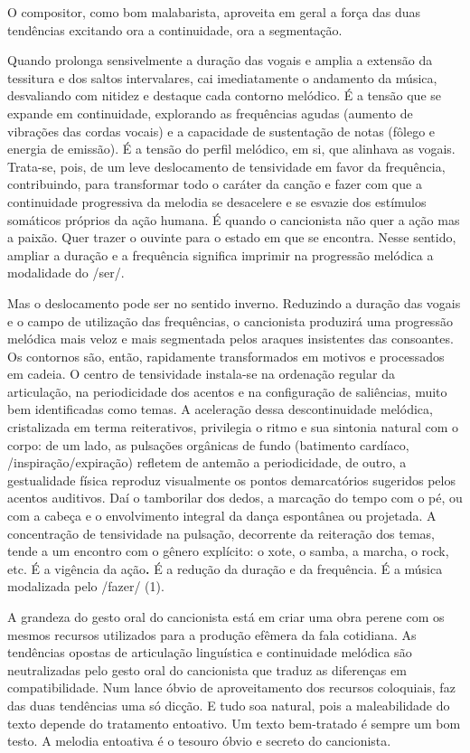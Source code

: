 O compositor, como bom malabarista, aproveita em geral a força das duas
tendências excitando ora a continuidade, ora a segmentação.

Quando prolonga sensivelmente a duração das vogais e amplia a extensão
da tessitura e dos saltos intervalares, cai imediatamente o andamento da
música, desvaliando com nitidez e destaque cada contorno melódico. É a
tensão que se expande em continuidade, explorando as frequências agudas
(aumento de vibrações das cordas vocais) e a capacidade de sustentação
de notas (fôlego e energia de emissão). É a tensão do perfil melódico,
em si, que alinhava as vogais. Trata-se, pois, de um leve deslocamento
de tensividade em favor da frequência, contribuindo, para transformar
todo o caráter da canção e fazer com que a continuidade progressiva da
melodia se desacelere e se esvazie dos estímulos somáticos próprios da
ação humana. É quando o cancionista não quer a ação mas a paixão. Quer
trazer o ouvinte para o estado em que se encontra. Nesse sentido,
ampliar a duração e a frequência significa imprimir na progressão
melódica a modalidade do /ser/.

Mas o deslocamento pode ser no sentido inverno. Reduzindo a duração das
vogais e o campo de utilização das frequências, o cancionista produzirá
uma progressão melódica mais veloz e mais segmentada pelos araques
insistentes das consoantes. Os contornos são, então, rapidamente
transformados em motivos e processados em cadeia. O centro de
tensividade instala-se na ordenação regular da articulação, na
periodicidade dos acentos e na configuração de saliências, muito bem
identificadas como temas. A aceleração dessa descontinuidade melódica,
cristalizada em terma reiterativos, privilegia o ritmo e sua sintonia
natural com o corpo: de um lado, as pulsações orgânicas de fundo
(batimento cardíaco, /inspiração/expiração) refletem de antemão a
periodicidade, de outro, a gestualidade física reproduz visualmente os
pontos demarcatórios sugeridos pelos acentos auditivos. Daí o tamborilar
dos dedos, a marcação do tempo com o pé, ou com a cabeça e o
envolvimento integral da dança espontânea ou projetada. A concentração
de tensividade na pulsação, decorrente da reiteração dos temas, tende a
um encontro com o gênero explícito: o xote, o samba, a marcha, o rock,
etc. É a vigência da ação\textbf{.} É a redução da duração e da
frequência. É a música modalizada pelo /fazer/ (1).

A grandeza do gesto oral do cancionista está em criar uma obra perene
com os mesmos recursos utilizados para a produção efêmera da fala
cotidiana. As tendências opostas de articulação linguística e
continuidade melódica são neutralizadas pelo gesto oral do cancionista
que traduz as diferenças em compatibilidade. Num lance óbvio de
aproveitamento dos recursos coloquiais, faz das duas tendências uma só
dicção. E tudo soa natural, pois a maleabilidade do texto depende do
tratamento entoativo. Um texto bem-tratado é sempre um bom testo. A
melodia entoativa é o tesouro óbvio e secreto do cancionista.

